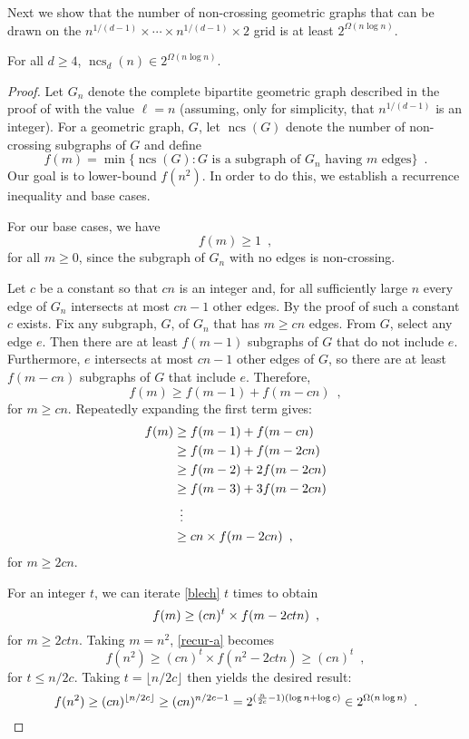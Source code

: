 \documentclass{patmorin}
\DeclareMathOperator{\ncs}{ncs}
\begin{document}
Next we show that the number of non-crossing geometric graphs that can
be drawn on the $n^{1/(d-1)}\times \cdots\times n^{1/(d-1)}\times 2$
grid is at least $2^{\Omega(n\log n)}$.

\begin{thm}
  For all $d\ge 4$, $\ncs_d(n) \in 2^{\Omega(n\log n)}$.
\end{thm}

\begin{proof}
  Let $G_n$ denote the complete bipartite geometric graph described in
  the proof of  with the value $\ell=n$ (assuming,
  only for simplicity, that $n^{1/(d-1)}$ is an integer).  For a geometric
  graph, $G$, let $\ncs(G)$ denote the number of non-crossing subgraphs
  of $G$ and define
  \[
     f(m) = \min\{ \ncs(G) : 
                \mbox{$G$ is a subgraph of $G_{n}$ having $m$ edges} \}
     \enspace . 
  \]
  Our goal is to lower-bound $f(n^2)$.  In order to do this, we establish
  a recurrence inequality and base cases.
  
  For our base cases, we have 
  \[ 
     f(m)\ge 1 \enspace ,
  \]
  for all $m\ge 0$, since the subgraph of $G_{n}$ with no edges is
  non-crossing.
  
  Let $c$ be a constant so that $cn$ is an integer and, for all
  sufficiently large $n$ every edge of $G_n$ intersects at most $cn-1$
  other edges.  By the proof of  such a constant
  $c$ exists.  Fix any subgraph, $G$, of $G_{n}$ that has $m\ge cn$ edges.
  From $G$, select any edge $e$. Then there are at least $f(m-1)$
  subgraphs of $G$ that do not include $e$.  Furthermore, $e$ intersects
  at most $cn-1$ other edges of $G$, so there are at least $f(m-cn)$
  subgraphs of $G$ that include $e$.  Therefore,
  \[  
     f(m) \ge f(m-1) + f(m-cn) \enspace ,
  \]
  for $m\ge cn$.  Repeatedly expanding the first term gives:
  \begin{align}
  f(m) & \ge  f(m-1) + f(m-cn) \notag \\
         & \ge  f(m-1) + f(m-2cn) \notag \\
         & \ge  f(m-2) + 2f(m-2cn) \notag \\
         & \ge  f(m-3) + 3f(m-2cn) \notag \\
         & \,\,\,\vdots  \notag \\
         & \ge  cn\times f(m-2cn) \enspace , \eqlabel{blech}
  \end{align}
  for $m\ge 2cn$.
  
  For an integer $t$, we can iterate \eqref{blech} $t$ times to obtain
  \begin{equation}
     f(m) \ge (cn)^t\times f(m-2ctn) \enspace ,
     \eqlabel{recur-a}
  \end{equation} 
  for $m\ge 2ctn$.  Taking $m=n^2$, \eqref{recur-a} becomes
  \[
     f(n^2) \ge (cn)^t\times f(n^2-2ctn) \ge (cn)^t \enspace ,
  \]
  for $t \le n/2c$.  Taking $t=\lfloor n/2c\rfloor$ then yields the
  desired result:
  \[
     f(n^2) \ge (cn)^{\lfloor n/2c\rfloor} 
            \ge (cn)^{n/2c - 1} 
            = 2^{(\frac{n}{2c}-1)(\log n+\log c)}
            \in 2^{\Omega(n\log n)} \enspace . \qedhere
  \]
\end{proof}
\end{document}
